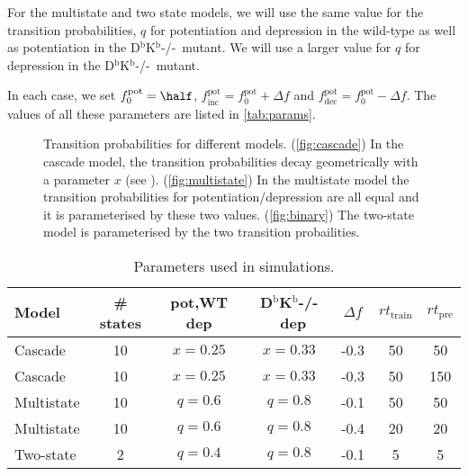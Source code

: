 \documentclass[12pt]{article}
\newcommand{\pot}{^{\text{pot}}}
\newcommand{\norm}{_0}
\newcommand{\inc}{_{\text{inc}}}
\newcommand{\dec}{_{\text{dec}}}
\newcommand{\KO}{D$^\mathrm{b}$K$^\mathrm{b}$-/-}
\begin{document}
For the multistate and two state models, we will use the same value for the transition probabilities, $q$ for potentiation and depression in the wild-type as well as potentiation in the \KO\ mutant.
We will use a larger value for $q$ for depression in the \KO\ mutant.

In each case, we set $f\pot\norm=\half$, $f\pot\inc=f\pot\norm+\Delta f$ and $f\pot\dec=f\pot\norm-\Delta f$. The values of all these parameters are listed in \autoref{tab:params}.

\begin{figure}
 \begin{center}
 \begin{myenuma}
  \item{}\label{fig:cascade}\hspace{0.5cm}
  \item{}\label{fig:multistate}\hspace{0.5cm}
  \item{}\label{fig:binary}
 \end{myenuma}
 \end{center}
  \caption{Transition probabilities for different models.
  (\ref{fig:cascade}) In the cascade model, the transition probabilities decay geometrically with a parameter $x$ (see \cite{Fusi2005cascade}).
  (\ref{fig:multistate}) In the multistate model the transition probabilities for potentiation/depression are all equal and it is parameterised by these two values.
  (\ref{fig:binary}) The two-state model is parameterised by the two transition probailities.} \label{fig:models}
\end{figure}

\begin{table}
 \begin{center}
  \begin{tabular}{|l|c|c|c|c|c|c|}
    \hline
    Model & \# states & pot,WT dep & \KO\ dep & $\Delta f$ & $rt_\text{train}$ & $rt_\text{pre}$ \\
    \hline
    Cascade    & 10 & $x=0.25$ & $x=0.33$ & -0.3 & 50 & 50 \\
    Cascade    & 10 & $x=0.25$ & $x=0.33$ & -0.3 & 50 & 150 \\
    Multistate & 10 & $q=0.6$  & $q=0.8$  & -0.1 & 50 & 50 \\
    Multistate & 10 & $q=0.6$  & $q=0.8$  & -0.4 & 20 & 20 \\
    Two-state  & 2  & $q=0.4$  & $q=0.8$  & -0.1 & 5 & 5 \\
    \hline
  \end{tabular}
 \end{center}
  \caption{Parameters used in simulations.} \label{tab:params}
\end{table}
\end{document}
